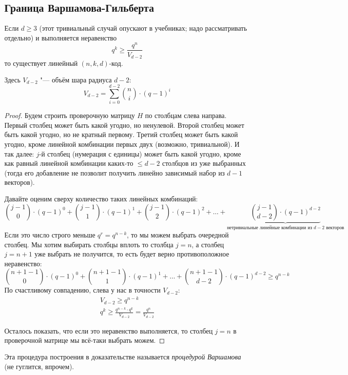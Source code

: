 \subsection{Граница Варшамова-Гильберта}
\begin{theorem}
	Если $d \ge 3$ (этот тривиальный случай опускают в учебниках; надо рассматривать отдельно)
	и выполняется неравенство
	\[
		q^k \ge \frac{q^n}{V_{d-2}}
	\]
	то существует линейный $(n, k, d)$-код.

	Здесь $V_{d-2}$ "--- объём шара радиуса $d-2$:
	\[
		V_{d-2} = \sum_{i=0}^{d-2}\binom{n}{i}\cdot(q-1)^i
	\]
\end{theorem}
\begin{proof}
	Будем строить проверочную матрицу $H$ по столбцам слева направа.
	Первый столбец может быть какой угодно, но ненулевой.
	Второй столбец может быть какой угодно, но не кратный первому.
	Третий столбец может быть какой угодно, кроме линейной комбинации первых двух (возможно, тривиальной).
	И так далее: $j$-й столбец (нумерация с единицы) может быть какой угодно, кроме
	как равный линейной комбинации каких-то $\le d-2$ столбцов из уже выбранных
	(тогда его добавление не позволит получить линейно зависимый набор из $d-1$ векторов).

	Давайте оценим сверху количество таких линейных комбинаций:
	\[
	\binom{j-1}{0} \cdot (q-1)^0 +
	\binom{j-1}{1}\cdot(q-1)^1 +
	\binom{j-1}{2}\cdot(q-1)^2 +
	\dots +
	\underbrace{\binom{j-1}{d-2} \cdot (q-1)^{d-2}}_\text{нетривиальные линейные комбинации из $d-2$ векторов}
	\]
	Если это число строго меньше $q^r=q^{n-k}$, то мы можем выбрать очередной столбец.
	Мы хотим выбирать столбцы вплоть то столбца $j=n$, а столбец $j=n+1$ уже выбрать не получится,
	то есть будет верно противоположное неравенство:
	\[
	\binom{n+1-1}{0}\cdot(q-1)^0 +
	\binom{n+1-1}{1}\cdot(q-1)^1 +
	\dots +
	\binom{n+1-1}{d-2} \cdot (q-1)^{d-2}
	\ge
	q^{n-k}
	\]
	По счастливому совпадению, слева у нас в точности $V_{d-2}$:
	\begin{gather*}
		V_{d-2} \ge q^{n-k} \\
		q^k \ge \frac{q^{n-k}\cdot q^k}{V_{d-2}} = \frac{q^n}{V_{d-2}}
	\end{gather*}

	Осталось показать, что если это неравенство выполняется,
	то столбец $j=n$ в проверочной матрице мы всё-таки выбрать можем. \TODO
\end{proof}
\begin{Rem}
	Эта процедура построения в доказательстве называется \textit{процедурой Варшамова}
	(не гуглится, впрочем).
\end{Rem}
